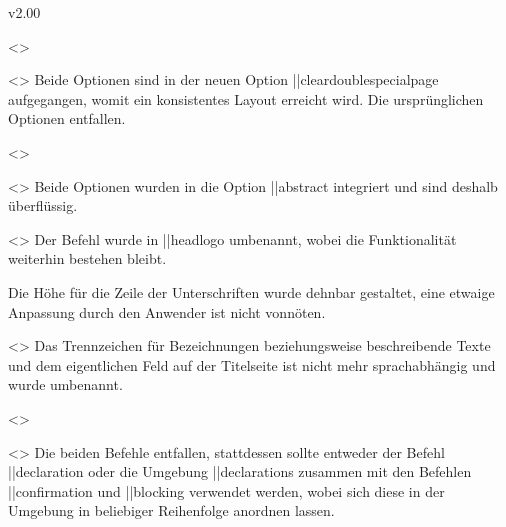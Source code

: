 \begin{Changes}{v2.00}
\begin{Obsolete}
  {}
  <>
\begin{Obsolete}
  {}
  <>
\printdeclarationlist
%
Beide Optionen sind in der neuen Option \Option||{cleardoublespecialpage} 
aufgegangen, womit ein konsistentes Layout erreicht wird. Die ursprünglichen 
Optionen entfallen. 
\end{Obsolete}
\end{Obsolete}

\begin{Obsolete}
  {}
  <>
\begin{Obsolete}
  {}
  <>
\printdeclarationlist
%
Beide Optionen wurden in die Option \Option||{abstract} integriert und sind 
deshalb überflüssig.
\end{Obsolete}
\end{Obsolete}

\begin{Obsolete}
  {}
  <>
\printdeclarationlist
%
Der Befehl wurde in \Macro||{headlogo} umbenannt, wobei die Funktionalität 
weiterhin bestehen bleibt.
\end{Obsolete}

\begin{Obsolete}
  {}
\printdeclarationlist
%
Die Höhe für die Zeile der Unterschriften wurde dehnbar gestaltet, eine etwaige 
Anpassung durch den Anwender ist nicht vonnöten.
\end{Obsolete}

\begin{Obsolete}
  {}
  <>
\printdeclarationlist
%
Das Trennzeichen für Bezeichnungen beziehungsweise beschreibende Texte und dem 
eigentlichen Feld auf der Titelseite ist nicht mehr sprachabhängig und wurde 
umbenannt.
\end{Obsolete}

\begin{Obsolete}
  {}
  <>
\begin{Obsolete}
  {}
  <>
\printdeclarationlist
%
Die beiden Befehle entfallen, stattdessen sollte entweder der Befehl 
\Macro||{declaration} oder die Umgebung \Environment||{declarations} zusammen 
mit den Befehlen \Macro||{confirmation} und \Macro||{blocking} verwendet 
werden, wobei sich diese in der Umgebung in beliebiger Reihenfolge anordnen 
lassen.
\end{Obsolete}
\end{Obsolete}


\end{Changes}
